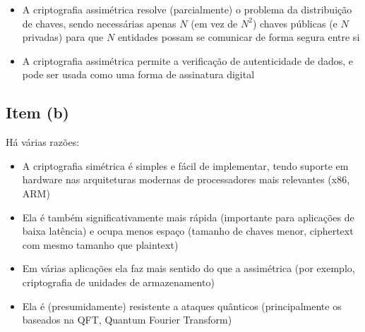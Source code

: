 \documentclass{article}
\begin{document}
\begin{itemize}
    \item A criptografia assimétrica resolve (parcialmente) o problema da distribuição de chaves, sendo necessárias apenas $N$ (em vez de $N^2$) chaves públicas (e $N$ privadas) para que $N$ entidades possam se comunicar de forma segura entre si
    \item A criptografia assimétrica permite a verificação de autenticidade de dados, e pode ser usada como uma forma de assinatura digital
\end{itemize}

\subsection*{Item (b)}

Há várias razões:

\begin{itemize}
    \item A criptografia simétrica é simples e fácil de implementar, tendo suporte em hardware nas arquiteturas modernas de processadores mais relevantes (x86, ARM)
    \item Ela é também significativamente mais rápida (importante para aplicações de baixa latência) e ocupa menos espaço (tamanho de chaves menor, ciphertext com mesmo tamanho que plaintext)
    \item Em várias aplicações ela faz mais sentido do que a assimétrica (por exemplo, criptografia de unidades de armazenamento)
    \item Ela é (presumidamente) resistente a ataques quânticos (principalmente os baseados na QFT, Quantum Fourier Transform)
\end{itemize}
\end{document}
